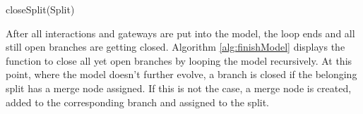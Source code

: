 \begin{algorithm}[H]
\small
\DontPrintSemicolon
\SetAlgoLined
{}
\caption{closeSplit(Split)}
\label{alg:finishModel}
\end{algorithm}
\vspace{0.5cm}
After all interactions and gateways are put into the model, the loop ends and all still open branches are getting closed. Algorithm \ref{alg:finishModel} displays the function to close all yet open branches by looping the model recursively. At this point, where the model doesn't further evolve, a branch is closed if the belonging split has a merge node assigned. If this is not the case, a merge node is created, added to the corresponding branch and assigned to the split.\\


